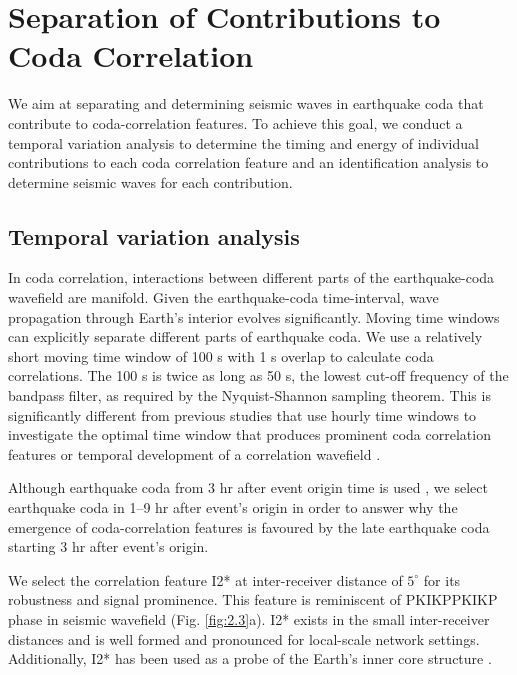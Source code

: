 \section{Separation of Contributions to Coda Correlation}\label{sec:theo_sc}

We aim at separating and determining seismic waves in earthquake coda that contribute to coda-correlation features. To achieve this goal, we conduct a temporal variation analysis to determine the timing and energy of individual contributions to each coda correlation feature and an identification analysis to determine seismic waves for each contribution.

\subsection{Temporal variation analysis}\label{subsec:theo_sc_temp}

In coda correlation, interactions between different parts of the earthquake-coda wavefield are manifold. Given the earthquake-coda time-interval, wave propagation through Earth's interior evolves significantly. Moving time windows can explicitly separate different parts of earthquake coda. We use a relatively short moving time window of 100 s with 1 s overlap to calculate coda correlations. The 100 s is twice as long as 50 s, the lowest cut-off frequency of the bandpass filter, as required by the Nyquist-Shannon sampling theorem. This is significantly different from previous studies that use hourly time windows to investigate the optimal time window that produces prominent coda correlation features \citep[e.g.,][]{lin_seismic_2013} or temporal development of a correlation wavefield \citep[e.g.,][]{poli_analysis_2017,kennett_evolution_2018}.



Although earthquake coda from 3 hr after event origin time is used  \citep[e.g.,][]{lin_seismic_2013,pham_earths_2018}, we select earthquake coda in 1--9 hr after event's origin in order to answer why the emergence of coda-correlation features is favoured by the late earthquake coda starting 3 hr after event's origin.




We select the correlation feature I2* at inter-receiver distance of $5^{\circ}$ for its robustness and signal prominence. This feature is reminiscent of PKIKPPKIKP phase in seismic wavefield (Fig. \ref{fig:2.3}a). I2* exists in the small inter-receiver distances and is well formed and pronounced for local-scale network settings. Additionally, I2* has been used as a probe of the Earth's inner core structure \citep[e.g.,][]{huang_high-resolution_2015,wang_equatorial_2015}.



